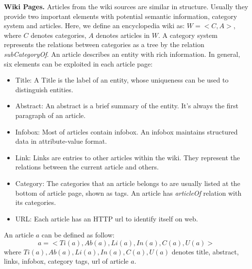 \documentclass[runningheads,a4paper]{llncs}
\newcommand{\para}[1]{\vspace{0.1cm}\noindent\textbf{#1}}
\begin{document}
\para{Wiki Pages.} Articles from the wiki sources are similar in structure. Usually they provide two important elements with potential semantic information, category system and articles. Here, we define an encyclopedia wiki as: $W = <C,A>$, where $C$ denotes categories, $A$ denotes articles in $W$. A category system represents the relations between categories as a tree by the relation \textit{subCategoryOf}. An article describes an entity with rich information. In general, six elements can be exploited in each article page:
\begin{itemize}
  \item Title: A Title is the label of an entity, whose uniqueness can be used to distinguish entities.
  \item Abstract: An abstract is a brief summary of the entity. It's always the first paragraph of an article.
  \item Infobox: Most of articles contain infobox. An infobox maintains structured data in attribute-value format.
  \item Link: Links are entries to other articles within the wiki. They represent the relations between the current article and others.
  \item Category: The categories that an article belongs to are usually listed at the bottom of article page, shown as tags. An article has \textit{articleOf} relation with its categories.
  \item URL: Each article has an HTTP url to identify itself on web.
\end{itemize}

%
An article $a$ can be defined as follow:
\begin{displaymath}
    a = <Ti(a),Ab(a),Li(a),In(a),C(a),U(a)>
\end{displaymath}
where $Ti(a),Ab(a),Li(a),In(a),C(a),U(a)$ denotes title, abstract, links, infobox, category tags, url of article $a$.
\end{document}
